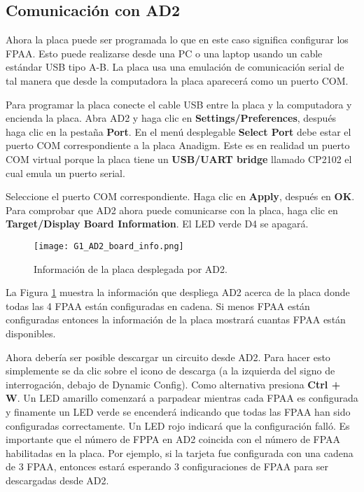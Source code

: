 	\subsection{Comunicación con AD2}

Ahora la placa puede ser programada lo que en este caso significa configurar los FPAA. Esto puede realizarse desde una PC o una laptop usando un cable estándar USB tipo A-B. La placa usa una emulación de comunicación serial de tal manera que  desde la computadora la placa aparecerá como un puerto COM.

Para programar la placa conecte el cable USB entre la placa y la computadora y encienda la placa. Abra AD2 y haga clic en \textbf{Settings/Preferences}, después haga clic en la pestaña \textbf{Port}. En el menú desplegable \textbf{Select Port} debe estar el puerto COM correspondiente a la placa Anadigm. Este es en realidad un puerto COM virtual porque la placa tiene un \textbf{USB/UART bridge} llamado CP2102 el cual emula un puerto serial. 

Seleccione el puerto COM correspondiente. Haga clic en \textbf{Apply}, después en \textbf{OK}. Para comprobar que AD2 ahora puede comunicarse con la placa, haga clic en \textbf{Target/Display Board Information}. El LED verde D4 se apagará.

\begin{figure}[hbtp]
\caption{Información de la placa desplegada por AD2.}
\label{fig:G1_AD2_board_info.png}
\centering
\texttt{[image: G1\_AD2\_board\_info.png]}
\end{figure}
	
	La Figura \ref{fig:G1_AD2_board_info.png} muestra la información que despliega AD2 acerca de la placa donde todas las 4 FPAA están configuradas en cadena. Si menos FPAA están configuradas entonces la información de la placa mostrará cuantas FPAA están disponibles.

Ahora debería ser posible descargar un circuito desde AD2. Para hacer esto simplemente se da clic sobre el icono de descarga (a la izquierda del signo de interrogación, debajo de Dynamic Config). Como alternativa presiona \textbf{Ctrl + W}. Un LED amarillo comenzará a parpadear mientras cada FPAA es configurada y finamente un LED verde se encenderá indicando que todas las FPAA han sido configuradas correctamente. Un LED rojo indicará que la configuración falló. Es importante que el número de FPPA en AD2 coincida con el número de FPAA habilitadas en la placa. Por ejemplo, si la tarjeta fue configurada con una cadena de 3 FPAA, entonces estará esperando 3 configuraciones de FPAA para ser descargadas desde AD2.
	

